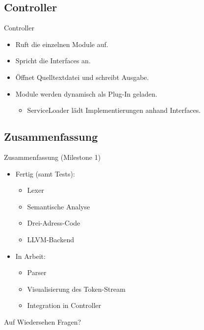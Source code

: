\documentclass[ucs,10pt]{beamer}
\newlength{\wideitemsep}
\let\olditem\item
\renewcommand{\item}{\setlength{\itemsep}{\wideitemsep}\olditem}
\begin{document}
\subsection{Controller}
\begin{frame}{Controller}
	\begin{itemize}
		\item Ruft die einzelnen Module auf.
		\item Spricht die Interfaces an.
		\item Öffnet Quelltextdatei und schreibt Ausgabe.
		\item Module werden dynamisch als Plug-In geladen.
		\begin{itemize}
			\item ServiceLoader lädt Implementierungen anhand Interfaces. 
		\end{itemize}
	\end{itemize}
\end{frame}

\subsection{Zusammenfassung}
\begin{frame}{Zusammenfassung (Milestone 1)}
	\begin{itemize}
	\item Fertig (samt Tests):
	\begin{itemize}
		\item Lexer
		\item Semantische Analyse
		\item Drei-Adress-Code
		\item LLVM-Backend
	\end{itemize}
	
	\item In Arbeit:
	\begin{itemize}
		\item Parser
		\item Visualisierung des Token-Stream
		\item Integration in Controller
	\end{itemize}
	\end{itemize}
\end{frame}

\begin{frame}{Auf Wiedersehen}
	Fragen?	
\end{frame}
\end{document}
